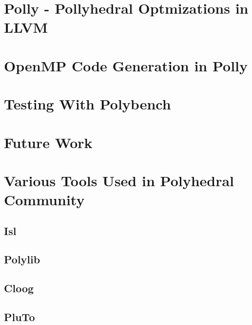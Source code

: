 \documentclass[MTech]{iitmdiss}
\begin{document}
\chapter{Polly - Pollyhedral Optmizations in LLVM}


\chapter{OpenMP Code Generation in Polly}


\chapter{Testing With Polybench}

\chapter{Future Work}



%




\appendix
 
\chapter{Various Tools Used in Polyhedral Community}
\section{Isl}
\section{Polylib}
\section{Cloog}
\section{PluTo}
\end{document}
